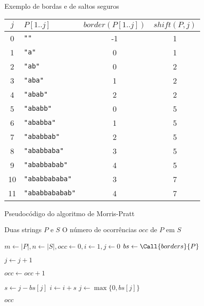 \begin{frame}[fragile]{Exemplo de bordas e de saltos seguros}

    \begin{center}
    \begin{tabularx}{0.9\textwidth}{cXcc}
        \toprule
        $j$ & $P[1..j]$ & $border(P[1..j])$ & $shift(P, j)$ \\
        \midrule
        0&\textcolor{red!70}{\verb|""|}&-1&1 \\
        1&\textcolor{red!70}{\verb|"a"|}&0&1 \\
        2&\textcolor{red!70}{\verb|"ab"|}&0&2 \\
        3&\textcolor{red!70}{\verb|"aba"|}&1&2 \\
        4&\textcolor{red!70}{\verb|"abab"|}&2&2 \\
        5&\textcolor{red!70}{\verb|"ababb"|}&0&5 \\
        6&\textcolor{red!70}{\verb|"ababba"|}&1&5 \\
        7&\textcolor{red!70}{\verb|"ababbab"|}&2&5 \\
        8&\textcolor{red!70}{\verb|"ababbaba"|}&3&5 \\
        9&\textcolor{red!70}{\verb|"ababbabab"|}&4&5 \\
        10&\textcolor{red!70}{\verb|"ababbababa"|}&3&7 \\
        11&\textcolor{red!70}{\verb|"ababbababab"|}&4&7 \\
        \bottomrule
    \end{tabularx}
    \end{center}

\end{frame}

\begin{frame}[fragile]{Pseudocódigo do algoritmo de Morris-Pratt}

    \begin{algorithm}[H]
        \caption{Algoritmo de Morris-Pratt}
        \begin{algorithmic}[1]
            \Require Duas strings $P$ e $S$
            \Ensure O número de ocorrências $occ$ de $P$ em $S$

                \State $m \gets |P|, n \gets |S|, occ \gets 0, i \gets 1, j \gets 0$
                \State $bs \gets \Call{borders}{P}$

                        \State $j \gets j + 1$
                    \EndWhile

                        \State $occ \gets occ + 1$
                    \EndIf

                    \State $s \gets j - bs[j]$
                    \State $i \gets i + s$
                    \State $j \gets \max\lbrace 0, bs[j]\rbrace$
                \EndWhile

                \State \Return $occ$
            \EndFunction
        \end{algorithmic}
    \end{algorithm}

\end{frame}
